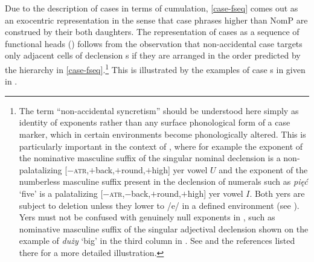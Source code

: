 Due to the description of cases in terms of  cumulation, \ref{case-fseq} comes out as an exocentric representation in the sense that case phrases higher than NomP are construed by their both daughters.
The representation of cases as a sequence of functional heads () follows from the observation that non-accidental case  targets only adjacent cells of declension s if they are arranged in the order predicted by the hierarchy in \ref{case-fseq}.\footnote{The term ``non-accidental syncretism'' should be understood here simply as identity of exponents rather than any surface phonological form of a case marker, which in certain environments become phonologically altered. This is particularly important in the context of , where for example the exponent of the  nominative masculine suffix of the singular nominal declension is a non-palatalizing [$-$\textsc{atr},$+$back,$+$round,$+$high] yer vowel $U$ and the exponent of the numberless masculine suffix present in the declension of numerals such as \textit{pi\k{e}\'c} `five' is a palatalizing [$-$\textsc{atr},$-$back,$+$round,$+$high] yer vowel $I$. Both yers are subject to deletion unless they lower to /e/ in a defined environment (see \citealt{Guss1980,Rubach1984}). Yers must not be confused with genuinely null exponents in , such as nominative masculine suffix of the singular adjectival declension shown on the example of \textit{du\.zy} `big' in the third column in . See \citet[35--38]{Wiland2009} and the references listed there for a more detailed illustration.
} %
 This is illustrated by the examples of case s in  given in . 
 
